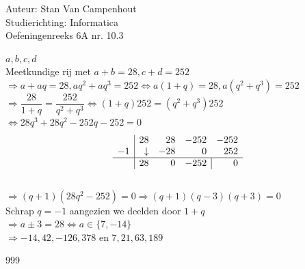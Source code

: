 \documentclass[a4paper]{article}
\begin{document}
  
\noindent \large Auteur: Stan Van Campenhout \\
\noindent \large Studierichting:  Informatica\\
\noindent \large Oefeningenreeks 6A nr. 10.3\\

\medskip

\normalsize

$ a, b, c, d $\\

Meetkundige rij met $ a + b = 28, c + d = 252 $\\

$ \Rightarrow a + aq = 28, aq^2 + aq^3 = 252 \Leftrightarrow a\left(1+q\right) = 28, a\left(q^2+q^3\right) = 252 $\\

$ \Rightarrow \dfrac{28}{1+q} = \dfrac{252}{q^2+q^3} \Leftrightarrow \left(1+q\right)252 = \left(q^2+q^3\right)252 $\\

$ \Leftrightarrow 28q^3+28q^2-252q-252 = 0 $\\

 \[ \begin{array}{c|rrrr}     
& 28 & 28 & -252 & -252 \\      
-1 & \downarrow  & -28 & 0 & 252   \\ \hline    
 & 28  & 0  &  \multicolumn{1}{c|}{-252}  & 0   
\end{array} \] \\

$ \Rightarrow \left(q+1\right)\left(28q^2-252\right) = 0 \Rightarrow  \left(q+1\right)\left(q-3\right)\left(q+3\right) = 0 $\\

Schrap $q = -1$ aangezien we deelden door $1+q $\\

$ \Rightarrow a \pm 3 = 28 \Leftrightarrow a \in \{7, -14\} $\\

$ \Rightarrow -14,42,-126,378$ en $ 7, 21, 63, 189 $\\

\begin{thebibliography}{999}
\end{thebibliography}
\end{document}

